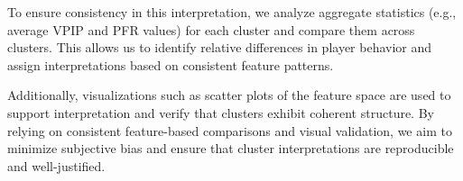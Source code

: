 \documentclass[11pt]{extarticle}
\begin{document}
To ensure consistency in this interpretation, we analyze aggregate statistics (e.g., average VPIP and PFR values) for each cluster and compare them across clusters. This allows us to identify relative differences in player behavior and assign interpretations based on consistent feature patterns.

Additionally, visualizations such as scatter plots of the feature space are used to support interpretation and verify that clusters exhibit coherent structure. By relying on consistent feature-based comparisons and visual validation, we aim to minimize subjective bias and ensure that cluster interpretations are reproducible and well-justified.



\end{document}
